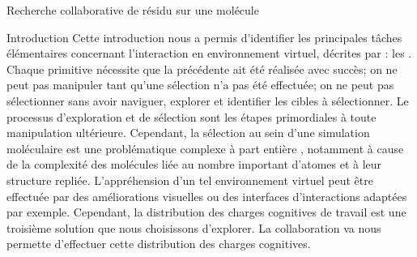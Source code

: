 \documentclass[myfrancais]{mythesis}
\begin{document}
	\begin{mychapter}{Recherche collaborative de résidu sur une molécule}
		\begin{mysection}{Introduction}
			Cette introduction nous a permis d'identifier les principales tâches élémentaires concernant l'interaction en environnement virtuel, décrites par  : les  .
			Chaque primitive nécessite que la précédente ait été réalisée avec succès; on ne peut pas manipuler tant qu'une sélection n'a pas été effectuée; on ne peut pas sélectionner sans avoir naviguer, explorer et identifier les cibles à sélectionner.
			Le processus d'exploration et de sélection sont les étapes primordiales à toute manipulation ultérieure.
			Cependant, la sélection au sein d'une simulation moléculaire est une problématique complexe à part entière , notamment à cause de la complexité des molécules liée au nombre important d'atomes et à leur structure repliée.
			L'appréhension d'un tel environnement virtuel peut être effectuée par des améliorations visuelles  ou des interfaces d'interactions adaptées  par exemple.
			Cependant, la distribution des charges cognitives de travail est une troisième solution que nous choisissons d'explorer.
			La collaboration va nous permette d'effectuer cette distribution des charges cognitives.


\end{mysection}
\end{mychapter}
\end{document}
